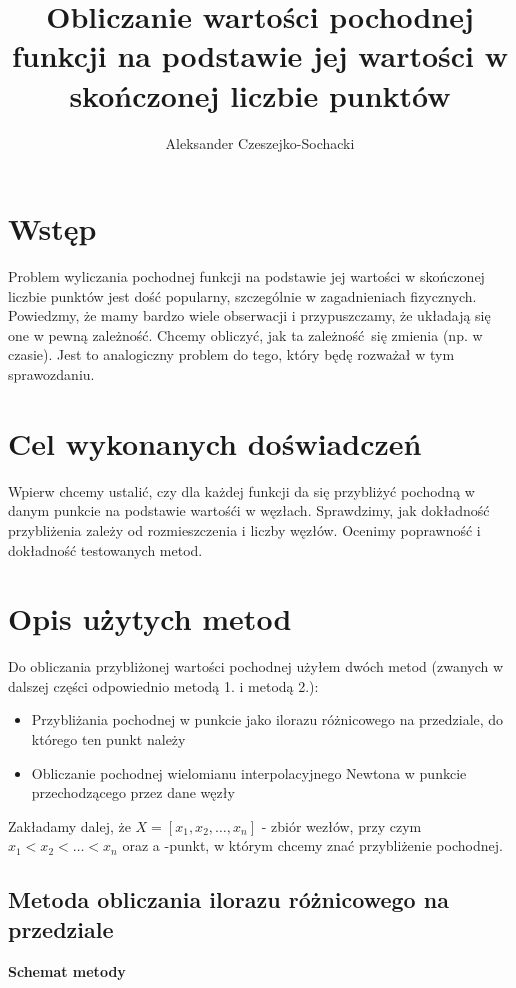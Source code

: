 \documentclass[a4paper,10pt]{article}
\title{Obliczanie wartości pochodnej funkcji na podstawie
jej wartości w skończonej liczbie punktów}
\author{Aleksander Czeszejko-Sochacki}
\begin{document}
 \maketitle
 \section{Wstęp}
  Problem wyliczania pochodnej funkcji na podstawie jej wartości w
  skończonej liczbie punktów jest dość popularny, szczególnie
  w zagadnieniach fizycznych. Powiedzmy, że mamy bardzo wiele obserwacji
  i przypuszczamy, że układają się one w pewną zależność. Chcemy obliczyć,
  jak ta zależność się zmienia (np. w czasie). Jest to analogiczny problem
  do tego, który będę rozważał w tym sprawozdaniu.
 
 \section{Cel wykonanych doświadczeń}
  Wpierw chcemy ustalić, czy dla każdej funkcji da się przybliżyć pochodną
  w danym punkcie na podstawie wartośći w węzłach. Sprawdzimy, jak dokładność przybliżenia zależy od 
  rozmieszczenia i liczby węzłów. Ocenimy poprawność i dokładność testowanych
  metod.
  
  \section{Opis użytych metod}
   Do obliczania przybliżonej wartości pochodnej użyłem dwóch metod (zwanych
   w dalszej części odpowiednio metodą 1. i metodą 2.):
   
   \begin{itemize}
    \item Przybliżania pochodnej w punkcie jako ilorazu różnicowego na przedziale, 
    do którego ten punkt należy
    \item Obliczanie pochodnej wielomianu interpolacyjnego Newtona w punkcie
    przechodzącego przez dane węzły
   \end{itemize}
   
   Zakładamy dalej, że $X = [x_1, x_2, \dots, x_n]$ - zbiór wezłów, przy
   czym $x_1 < x_2 < \dots < x_n$ oraz a -punkt, w którym chcemy
   znać przybliżenie pochodnej.
   
   \subsection{Metoda obliczania ilorazu różnicowego na przedziale}
   \begin{center}
    \textbf{Schemat metody}
   \end{center}
   
\end{document}
